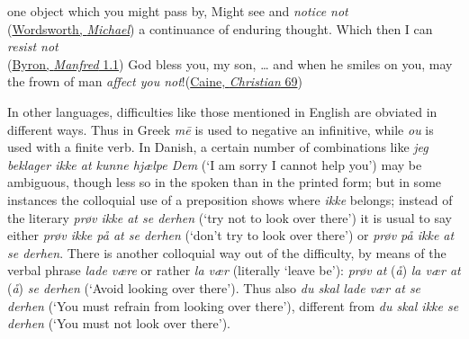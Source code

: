 \ea \label{ex:05-96}
\ea
one object which you might pass by, Might see and \textit{notice not}\\\hfill(\href{https://archive.org/details/poemsofwilliamwo00wor/page/50/mode/2up?q=%22one+object+which+you+might+pass+by%22&view=theater}{Wordsworth, \textit{Michael}})
\ex
a continuance of enduring thought. Which then I can \textit{resist not}\\\hfill(\href{https://archive.org/details/manfreddramaticp06byro/page/n11/mode/2up?q=continuance&view=theater}{Byron, \textit{Manfred} 1.1})
\ex
God bless you, my son, {\dots} and when he smiles on you, may the frown of man \textit{affect you not}!\hfill(\href{https://archive.org/details/christianstory00cainrich/page/70/mode/2up?q=%22frown%22&view=theater}{Caine, \textit{Christian} 69}) %
\z
\z{}

In other languages, difficulties like those mentioned in English are obviated in different ways. Thus in Greek \textit{mē} is used to negative an infinitive, while \textit{ou} is used with a finite verb. In Danish, a certain number of combinations like \textit{jeg beklager ikke at kunne hjælpe Dem} (`I am sorry I cannot help you') may be ambiguous, though less so in the spoken than in the printed form; but in some instances the colloquial use of a preposition shows where \textit{ikke} belongs; instead of the literary \textit{prøv ikke at se derhen} (`try not to look over there') it is usual to say either \textit{prøv ikke på at se derhen} (`don't try to look over there') or \textit{prøv på ikke at se derhen}. There is another colloquial way out of the difficulty, by means of the verbal phrase \textit{lade være} or rather \textit{la vær} (literally `leave be'): %
\textit{prøv at} (\textit{å}) \textit{la vær at} (\textit{å}) \textit{se derhen} (`Avoid looking over there'). Thus also \textit{du skal lade vær at se derhen} (`You must refrain from looking over there'), different from \textit{du skal ikke se derhen} (`You must not look over there').

